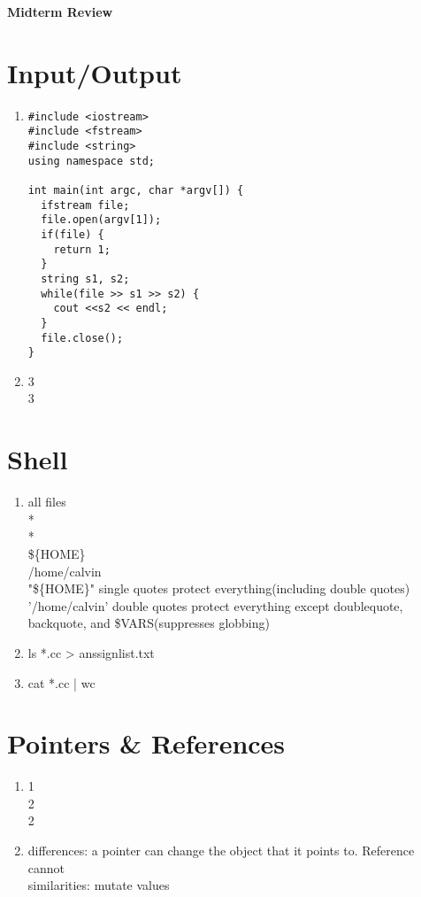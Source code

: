 \documentclass[12pt]{article}
\begin{document}
    
\begin{center}
    \textbf{\huge Midterm Review}
\end{center}

\section{Input/Output}
\begin{enumerate}
    \item \begin{verbatim}
#include <iostream>
#include <fstream>
#include <string>
using namespace std;

int main(int argc, char *argv[]) {
  ifstream file;
  file.open(argv[1]);
  if(file) {
    return 1;
  }
  string s1, s2;
  while(file >> s1 >> s2) {
    cout <<s2 << endl;
  }
  file.close();
}    
\end{verbatim}
    \item 3\\ 3
\end{enumerate}

\section{Shell}
\begin{enumerate}
    \item all files\\
    *\\
    *\\
    \$\{HOME\}\\
    /home/calvin\\
    "\$\{HOME\}"    single quotes protect everything(including double quotes)\\
    '/home/calvin'   double quotes protect everything except 
    doublequote, backquote, and \$VARS(suppresses globbing)
    \item ls *.cc > anssignlist.txt
    \item cat *.cc | wc
\end{enumerate}

\section{Pointers \& References}
\begin{enumerate}
    \item 1\\ 2\\ 2
    \item differences: a pointer can change the object that it points to. Reference cannot\\
    similarities: mutate values
\end{enumerate}
\end{document}
